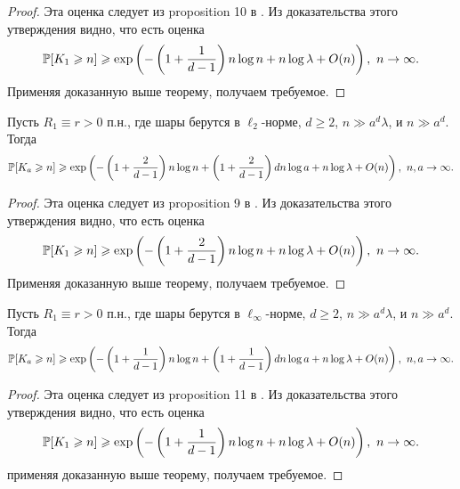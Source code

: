 \begin{proof}
    Эта оценка следует из proposition 10 в \cite{AL}. Из доказательства этого утверждения видно, что есть оценка 
    $$\mathbb{P}[K_1 \geqslant n] \geqslant \exp \left(-\left(1+\dfrac{1}{d-1}\right)n\log n   +n\log\lambda + O(n)\right),\  n \to \infty.$$ Применяя доказанную выше теорему, получаем требуемое.
\end{proof}{}

\begin{cor}
Пусть $R_1\equiv r > 0$ п.н., где шары берутся в $\ell_2$-норме, $d\geq 2$, $n \gg a^d\lambda$, и $n\gg a^d$. 
Тогда $$\mathbb{P}[K_a \geqslant n] \geqslant \exp \left(-\left(1+\dfrac{2}{d-1}\right)n\log n + \left(1+\dfrac{2}{d-1}\right)dn\log a  +n\log\lambda + O(n)\right),\  n, a\to \infty.$$
\end{cor}{}

\begin{proof}
    Эта оценка следует из proposition 9 в \cite{AL}. Из доказательства этого утверждения видно, что есть оценка 
    $$\mathbb{P}[K_1 \geqslant n] \geqslant \exp \left(-\left(1+\dfrac{2}{d-1}\right)n\log n   +n\log\lambda + O(n)\right),\  n \to \infty.$$ Применяя доказанную выше теорему, получаем требуемое.
\end{proof}{}

\begin{cor}
Пусть $R_1\equiv r > 0$ п.н., где шары берутся в $\ell_\infty$-норме, $d\geq 2$, $n \gg a^d\lambda$, и $n\gg a^d$. 
Тогда $$\mathbb{P}[K_a \geqslant n] \geqslant \exp \left(-\left(1+\dfrac{1}{d-1}\right)n\log n + \left(1+\dfrac{1}{d-1}\right)dn\log a  +n\log\lambda + O(n)\right),\  n, a\to \infty.$$
\end{cor}{}

\begin{proof}
    Эта оценка следует из proposition 11 в \cite{AL}. Из доказательства этого утверждения видно, что есть оценка 
    $$\mathbb{P}[K_1 \geqslant n] \geqslant \exp \left(-\left(1+\dfrac{1}{d-1}\right)n\log n   +n\log\lambda + O(n)\right),\  n \to \infty.$$ применяя доказанную выше теорему, получаем требуемое.
\end{proof}{}


